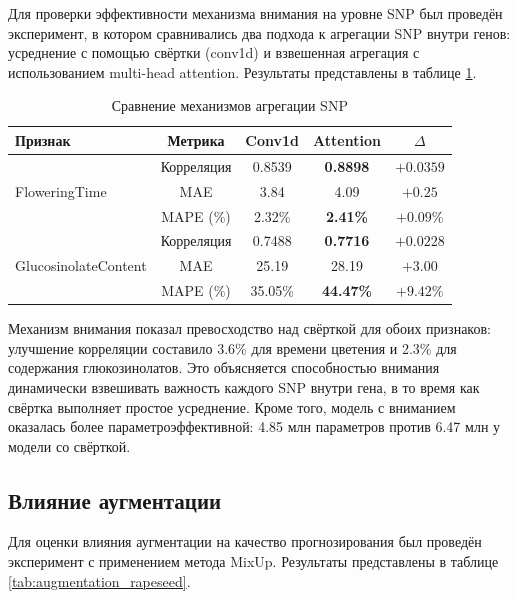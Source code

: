 Для проверки эффективности механизма внимания на уровне SNP был 
проведён эксперимент, в котором сравнивались два подхода к агрегации 
SNP внутри генов: усреднение с помощью свёртки (conv1d) и взвешенная 
агрегация с использованием multi-head attention. Результаты представлены 
в таблице \ref{tab:agg_comparison}.

\begin{table}
	\centering
	\caption{Сравнение механизмов агрегации SNP}
	\label{tab:agg_comparison}
	\begin{tabular}{|l|c|c|c|c|}
		\hline
		\textbf{Признак} & \textbf{Метрика} & \textbf{Conv1d} & \textbf{Attention} & $\Delta$ \\ \hline
		\multirow{3}{*}{FloweringTime} & Корреляция & 0.8539 & \textbf{0.8898} & $+0.0359$ \\
		& MAE & 3.84 & 4.09 & $+0.25$ \\
		& MAPE (\%) & 2.32\% & \textbf{2.41\%} & $+0.09\%$ \\ \hline
		\multirow{3}{*}{GlucosinolateContent} & Корреляция & 0.7488 & \textbf{0.7716} & $+0.0228$ \\
		& MAE & 25.19 & 28.19 & $+3.00$ \\
		& MAPE (\%) & 35.05\% & \textbf{44.47\%} & $+9.42\%$ \\ \hline
	\end{tabular}
\end{table}

Механизм внимания показал превосходство над свёрткой для обоих 
признаков: улучшение корреляции составило 3.6\% для времени цветения 
и 2.3\% для содержания глюкозинолатов. Это объясняется способностью 
внимания динамически взвешивать важность каждого SNP внутри гена, в 
то время как свёртка выполняет простое усреднение. Кроме того, модель 
с вниманием оказалась более параметроэффективной: 4.85 млн параметров 
против 6.47 млн у модели со свёрткой.

\subsection{Влияние аугментации}

Для оценки влияния аугментации на качество прогнозирования был 
проведён эксперимент с применением метода MixUp. Результаты представлены 
в таблице \ref{tab:augmentation_rapeseed}.


